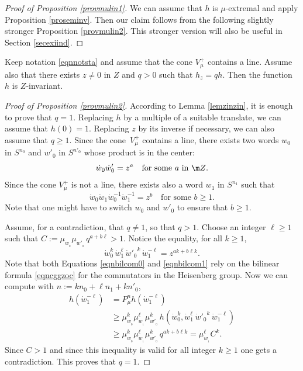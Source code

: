 \begin{proof}[Proof of Proposition \ref{provmulin1}]
We can assume that $h$ is $\mu$-extremal
and apply Proposition \ref{proseminv}.
Then our claim follows from the following slightly stronger
Proposition \ref{provmulin2}.
This stronger version will also be useful in Section \ref{secexiind}.
\end{proof}

\begin{Prop}

\label{provmulin2}
Keep notation \eqref{eqnnotsta} and assume that
the cone $V^+_\mu$ contains a line.
Assume also that there exists $z\neq 0$ in $Z$ and $q>0$ such that
$h_z=qh$. Then the function $h$ is $Z$-invariant.
\end{Prop}

\begin{proof}[Proof of Proposition \ref{provmulin2}]
According to Lemma \ref{lemzinzin}, it is enough to prove that $q=1$.
Replacing $h$ by a multiple of a suitable translate, we can assume that $h(0)= 1$.
Replacing $z$ by its inverse if necessary, we can also assume that $q\geq 1$.
Since the cone~$V_\mu^+$ contains a line,
there exists two words
$w_0$ in $S^{n_0}$ and $w'_0$ in $S^{n'_0}$
whose product is in the center:
\[
\dot{w}_0\dot{w}'_0= z^a
\quad\text{for some $a$ in $\m Z$.}
\]
Since the cone $V^+_\mu$ is not a line, there exists also a word $w_1$ in $S^{n_1}$ such that
\begin{equation}
\label{eqnbilcom0}
\dot{w}_0\dot{w}_1\dot{w}^{-1}_0\dot{w}_1^{-1}= z^b
\quad\text{for some $b\geq 1$.}
\end{equation}
Note that one might have to switch $w_0$ and $w'_0$
to ensure that $b\geq 1$.

Assume, for a contradiction, that $q\neq 1$, so that $q>1$. Choose an integer $\ell\geq 1$
such that $C:=\mu_{w_{_0}}\mu_{w'_{_0}}\,q^{a+b\ell}>1$. Notice the equality, for all $k\geq 1$,
\begin{equation}
\label{eqnbilcom1}
\dot{w}_0^k \,\dot{w}_1^\ell\, {\mbox{$\dot{w}$}'_0}^k\, \dot{w}_1^{-\ell} = z^{ak+b\ell k}.
\end{equation}
Note that both Equations \eqref{eqnbilcom0} and \eqref{eqnbilcom1} rely on
the bilinear formula \eqref{eqncggzoc}
for the commutators in the Heisenberg group.
Now we can compute with $n:=kn_0\!+\!\ell n_1\!+\! kn'_0$,
\begin{align*}
\label{eqnhwlcln}
h(\dot{w}_1^{-\ell})&=
P_\mu^{n}h(\dot{w}_1^{-\ell})\\
&\geq
\mu_{w_{_0}}^k \mu_{w_{_1}}^\ell \mu_{w'_{_0}}^k\,
h(\dot{w}_0^k, \dot{w}_1^\ell\, {\mbox{$\dot{w}$}'_0}^k\, \dot{w}_1^{-\ell})\\
&\geq
\mu_{w_{_0}}^k \mu_{w_{_1}}^\ell \mu_{w'_{_0}}^k\, q^{ak+b\ell k}
= \mu_{w_{_1}}^\ell C^k.
\end{align*}
Since $C>1$ and since this inequality is valid for all integer $k\geq 1$
one gets a contradiction. This proves that $q= 1$.
\end{proof}

